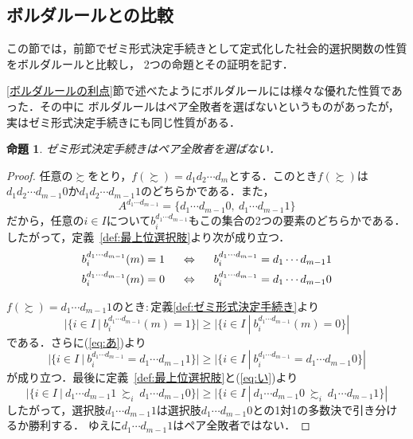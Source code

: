 \documentclass[dvipdfmx]{jsarticle}
\newtheorem{proposition}[definition]{命題}
\begin{document}
\subsection{ボルダルールとの比較}\label{subsec:ボルダルールとの比較}
この節では，前節でゼミ形式決定手続きとして定式化した社会的選択関数の性質をボルダルールと比較し，
2つの命題とその証明を記す．

\ref{ボルダルールの利点}節で述べたようにボルダルールには様々な優れた性質であった．その中に
ボルダルールはペア全敗者を選ばないというものがあったが，実はゼミ形式決定手続きにも同じ性質がある．
\begin{proposition}
  ゼミ形式決定手続きはペア全敗者を選ばない．
\end{proposition}
\begin{proof}
  任意の$\succsim$をとり，$f(\succsim) = d_1d_2\cdots d_m$とする．このとき$f(\succsim)$は
  $d_1d_2\cdots d_{m-1}0$か$d_1d_2\cdots d_{m-1}1$のどちらかである．また，
  \begin{equation}\label{eq:い}
    A^{d_1\cdots d_{m-1}} = \{d_1\cdots d_{m-1}0,\ d_1\cdots d_{m-1}1 \}
  \end{equation}
  だから，任意の$i \in I$について$b_i^{d_1\cdots d_{m-1}}$もこの集合の2つの要素のどちらかである．
  したがって，定義~\ref{def:最上位選択肢}より次が成り立つ．
  \begin{equation}\label{eq:あ}
    \begin{gathered}
      b_{i}^{d_1\cdots d_{m-1}}(m) = 1\hspace{5mm} \Leftrightarrow \hspace{5mm} b_{i}^{d_1\cdots d_{m-1}} = d_1\cdots d_{m-1}1 \\
      b_{i}^{d_1\cdots d_{m-1}}(m) = 0\hspace{5mm} \Leftrightarrow \hspace{5mm} b_{i}^{d_1\cdots d_{m-1}} = d_1\cdots d_{m-1}0
    \end{gathered}
  \end{equation}
  
  \noindent$f(\succsim) = d_1\cdots d_{m-1}1$のとき$\colon$定義\ref{def:ゼミ形式決定手続き}より
  \[
    |\{ i \in I \ | \ b_{i}^{d_1\cdots d_{m-1}}(m)=1 \}| \geq |\{ i \in I \ | \ b_{i}^{d_1\cdots d_{m-1}}(m)=0 \}|
  \]
  である．さらに(\ref{eq:あ})より
  \[
    |\{ i \in I \ | \ b_{i}^{d_1\cdots d_{m-1}}=d_1\cdots d_{m-1}1 \}| \geq
    |\{ i \in I \ | \ b_{i}^{d_1\cdots d_{m-1}}=d_1\cdots d_{m-1}0 \}|
  \]
  が成り立つ．最後に定義~\ref{def:最上位選択肢}と(\ref{eq:い})より
  \[
    |\{ i \in I \ | \ d_1\cdots d_{m-1}1\ \succsim_i\ d_1\cdots d_{m-1}0 \}| \geq
    |\{ i \in I \ | \ d_1\cdots d_{m-1}0\ \succsim_i\ d_1\cdots d_{m-1}1 \}|
  \]
  したがって，選択肢$d_1\cdots d_{m-1}1$は選択肢$d_1\cdots d_{m-1}0$との1対1の多数決で引き分けるか勝利する．
  ゆえに$d_1\cdots d_{m-1}1$はペア全敗者ではない．


\end{proof}
\end{document}
